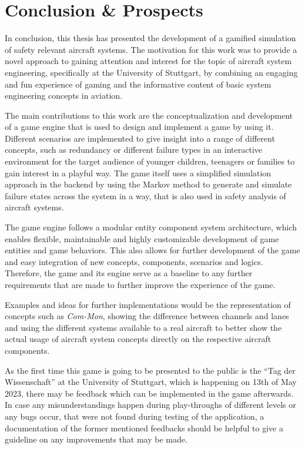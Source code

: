 \chapter{Conclusion \& Prospects}\label{ch:conclusion-&-prospects}
In conclusion, this thesis has presented the development of a gamified simulation of safety relevant aircraft systems.
The motivation for this work was to provide a novel approach to gaining attention and interest for the topic of aircraft
system engineering, specifically at the University of Stuttgart, by combining an engaging and fun experience of gaming and the
informative content of basic system engineering concepts in aviation.

The main contributions to this work are the conceptualization and development of a game engine that is used to
design and implement a game by using it.
Different scenarios are implemented to give insight into a range of different concepts, such as redundancy or different failure types in an
interactive environment for the target audience of younger children, teenagers or families to gain interest in a playful way.
The game itself uses a simplified simulation approach in the backend by using the Markov method to generate and simulate failure states
across the system in a way, that is also used in safety analysis of aircraft systems.

The game engine follows a modular entity component system architecture, which enables flexible, maintainable and highly customizable
development of game entities and game behaviors.
This also allows for further development of the game and easy integration of new concepts, components, scenarios and logics.
Therefore, the game and its engine serve as a baseline to any further requirements that are made to further improve the
experience of the game.

Examples and ideas for further implementations would be the representation of concepts such as \textit{Com-Mon},
showing the difference between channels and lanes and using the different systems available to a real aircraft
to better show the actual usage of aircraft system concepts directly on the respective aircraft components.

As the first time this game is going to be presented to the public is the ``Tag der Wissenschaft'' at the University of Stuttgart, which is happening
on 13th of May 2023, there may be feedback which can be implemented in the game afterwards.
In case any misunderstandings happen during play-throughs of different levels or any bugs occur,
that were not found during testing of
the application, a documentation of the former mentioned feedbacks should be helpful to give a guideline
on any improvements that may be made.

